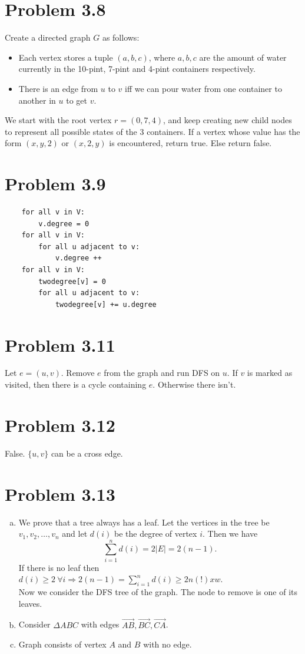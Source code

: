 \documentclass[12pt]{report}
\begin{document}
\section{Problem 3.8}
Create a directed graph $G$ as follows:
\begin{itemize}
	\item Each vertex stores a tuple $(a,b,c)$, where $a,b,c$ are the amount of water currently in the 10-pint, 7-pint and 4-pint containers respectively.
	\item There is an edge from $u$ to $v$ iff we can pour water from one container to another in $u$ to get $v$.
\end{itemize}
We start with the root vertex $r = (0,7,4)$, and keep creating new child nodes to represent all possible states of the 3 containers. If a vertex whose value has the form $(x,y,2)$ or $(x,2,y)$ is encountered, return true. Else return false.

\section{Problem 3.9}
\begin{lstlisting}
	for all v in V:
		v.degree = 0
	for all v in V:
		for all u adjacent to v:
			v.degree ++
	for all v in V:
		twodegree[v] = 0
		for all u adjacent to v:
			twodegree[v] += u.degree
\end{lstlisting}

\section{Problem 3.11}
Let $e = (u,v)$. Remove $e$ from the graph and run DFS on $u$. If $v$ is marked as visited, then there is a cycle containing $e$. Otherwise there isn't.

\section{Problem 3.12}
False. $\{u,v\}$ can be a cross edge. 

\section{Problem 3.13}
\begin{enumerate}[(a)]
	\item We prove that a tree always has a leaf. Let the vertices in the tree be $v_1, v_2, \ldots, v_n$ and let $d(i)$ be the degree of vertex $i$. Then we have $$\sum_{i=1}^n d(i) = 2 | E | = 2(n-1).$$
	If there is no leaf then $d(i) \ge 2 \ \forall i \Rightarrow \displaystyle 2(n-1) = \sum_{i=1}^n d(i) \ge 2n (!)xw$. \\
	Now we consider the DFS tree of the graph. The node to remove is one of its leaves.
	\item Consider $\Delta ABC$ with edges $\overrightarrow{AB}, \overrightarrow{BC}, \overrightarrow{CA}$.
	\item Graph consists of vertex $A$ and $B$ with no edge.
\end{enumerate}
\end{document}
